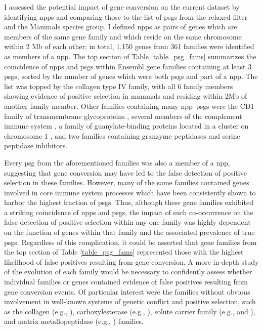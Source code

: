 I assessed the potential impact of gene conversion on the current
dataset by identifying \acp{npp} and comparing those to the list of
\psgefive \acp{psg} from the relaxed \sw filter and the Mammals
species group. I defined \acp{npp} as pairs of genes which are members
of the same \ens gene family and which reside on the same chromosome
within 2 Mb of each other; in total, 1,150 genes from 361 \ens
families were identified as members of a \ac{npp}. The top section of
Table \ref{table_psg_fams} summarizes the coincidence of \acp{npp}
and \acp{psg} within Ensembl gene families containing at least 3
\acp{psg}, sorted by the number of genes which were both \acp{psg} and
part of a \ac{npp}. The list was topped by the collagen type IV
family, with all 6 family members showing evidence of positive
selection in mammals and residing within 2Mb of another family
member. Other families containing many \ac{npp}--\acp{psg} were the
CD1 family of transmembrane glycoproteins \citep{Joyce2001}, several
members of the complement immune system \citep{Nonaka2006}, a family
of guanylate-binding proteins located in a cluster on chromosome 1
\citep{Olszewski2006}, and two families containing granzyme peptidases
and serine peptidase inhibitors.

Every \ac{psg} from the aforementioned families was also a member of a
\ac{npp}, suggesting that gene conversion may have led to the false
detection of positive selection in these families. However, many of
the same families contained genes involved in core immune system
processes which have been consistently shown to harbor the highest
fraction of \acp{psg}. Thus, although these gene families exhibited a
striking coincidence of \acp{npp} and \acp{psg}, the impact of such
co-occurrence on the false detection of positive selection within any
one family was highly dependent on the function of genes within that
family and the associated prevalence of true \acp{psg}. Regardless of
this complication, it could be asserted that gene families from the
top section of Table \ref{table_psg_fams} represented those with the
highest likelihood of false positives resulting from gene
conversion. A more in-depth study of the evolution of each family
would be necessary to confidently assess whether individual families
or genes contained evidence of false positives resulting from gene
conversion events. Of particular interest were the families without
obvious involvement in well-known systems of genetic conflict and
positive selection, such as the collagen (e.g., ),
carboxylesterase (e.g., ), solute carrier family (e.g.,
 and ), and matrix metallopeptidase
(e.g., ) families.


